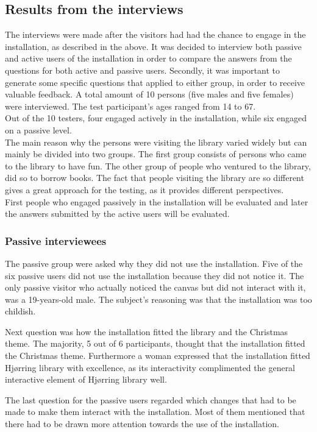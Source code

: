 \subsection{Results from the interviews}
The interviews were made after the visitors had had the chance to engage in the installation, as described in the above. It was decided to interview both passive and active users of the installation in order to compare the answers from the questions for both active and passive users. Secondly, it was important to generate some specific questions that applied to either group, in order to receive valuable feedback. A total amount of 10 persons (five males and five females) were interviewed. The test participant's ages ranged from 14 to 67.\\ Out of the 10 testers, four engaged actively in the installation, while six engaged on a passive level.\\
The main reason why the persons were visiting the library varied widely but can mainly be divided into two groups. The first group consists of persons who came to the library to have fun. The other group of people who ventured to the library, did so to borrow books.
The fact that people visiting the library are so different gives a great approach for the testing, as it provides different perspectives.\\
First people who engaged passively in the installation will be evaluated and later the answers submitted by the active users will be evaluated.\\

\subsubsection{Passive interviewees}
The passive group were asked why they did not use the installation. Five of the six passive users did not use the installation because they did not notice it. The only passive visitor who actually noticed the canvas but did not interact with it, was a 19-years-old male. The subject's reasoning was that the installation was too childish. 

Next question was how the installation fitted the library and the Christmas theme. The majority, 5 out of 6 participants, thought that the installation fitted the Christmas theme. Furthermore a woman expressed that the installation fitted Hj{\o}rring library with excellence, as its interactivity complimented the general interactive element of Hj{\o}rring library well. 

The last question for the passive users regarded which changes that had to be made to make them interact with the installation. Most of them mentioned that there had to be drawn more attention towards the use of the installation.

